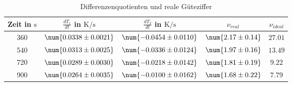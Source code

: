 \begin{table}
 \centering
 \begin{tabular}{S S S S S }
 \toprule
{Zeit in $\si{\second}$} & {$\frac{dT_1}{dt}$ in $\si{\kelvin \per \second}$} & {$\frac{dT_2}{dt}$ in $\si{\kelvin \per \second}$} & {$\nu_{real}$}& {$\nu_{ideal}$} \\
\midrule

360 & $\num{ 0.0338 \pm 0.0021 }$ & $\num{ -0.0454 \pm 0.0110 }$ & $\num{ 2.17 \pm 0.14 }$ & $\num{ 27.01 }$\\

540 & $\num{ 0.0313 \pm 0.0025 }$ & $\num{ -0.0336 \pm 0.0124 }$ & $\num{ 1.97 \pm 0.16 }$ & $\num{ 13.49 }$\\

720 & $\num{ 0.0289 \pm 0.0030 }$ & $\num{ -0.0218 \pm 0.0142 }$ & $\num{ 1.81 \pm 0.19 }$ & $\num{ 9.22 }$\\

900 & $\num{ 0.0264 \pm 0.0035 }$ & $\num{ -0.0100 \pm 0.0162 }$ & $\num{ 1.68 \pm 0.22 }$ & $\num{ 7.79 }$\\ 

\bottomrule
 \end{tabular}
 \caption{Differenzenquotienten und reale Güteziffer}
 \label{tab: dTdt}
  \end{table}
